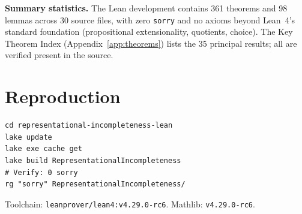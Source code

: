 \documentclass[11pt]{article}
\begin{document}
\noindent
\textbf{Summary statistics.}
The Lean development contains 361 theorems and 98 lemmas across 30
source files, with zero \texttt{sorry} and no axioms beyond Lean~4's
standard foundation (propositional extensionality, quotients, choice).
The Key Theorem Index (Appendix~\ref{app:theorems}) lists the 35
principal results; all are verified present in the source.

\section{Reproduction}
\label{app:repro}

\begin{verbatim}
cd representational-incompleteness-lean
lake update
lake exe cache get
lake build RepresentationalIncompleteness
# Verify: 0 sorry
rg "sorry" RepresentationalIncompleteness/
\end{verbatim}

\noindent
Toolchain: \texttt{leanprover/lean4:v4.29.0-rc6}. Mathlib: \texttt{v4.29.0-rc6}.
\end{document}
